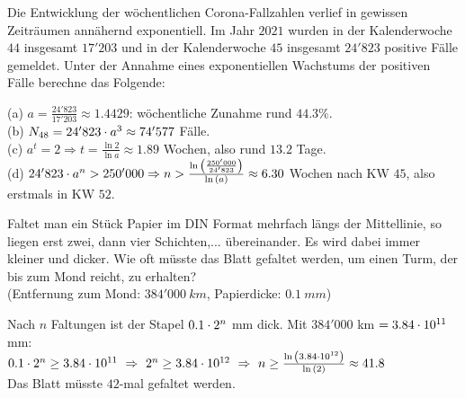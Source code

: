 \documentclass[11pt]{exam}
\begin{document}
\begin{questions}
\question[6]
Die Entwicklung der wöchentlichen Corona-Fallzahlen verlief in gewissen Zeiträumen annähernd exponentiell. Im Jahr $2021$ wurden in der Kalenderwoche $44$ insgesamt $17'203$ und in der Kalenderwoche $45$ insgesamt $24'823$ positive Fälle gemeldet. Unter der Annahme eines exponentiellen Wachstums der positiven Fälle berechne das Folgende:
{\begin{solution}
		(a) $a=\frac{24'823}{17'203}\approx1.4429$: wöchentliche Zunahme rund $44.3\%$.\\
		(b) $N_{48}=24'823\cdot a^3\approx74'577$ Fälle.\\
		(c) $a^t=2\Rightarrow t=\frac{\ln{2}}{\ln{a}}\approx1.89$ Wochen, also rund $13.2$ Tage.\\
		(d) $24'823\*a^n>250'000\Rightarrow n>\frac{\ln{\frac{250'000}{24'823}}}{\ln{a}}\approx6.30$ Wochen nach KW $45$, also erstmals in KW $52$.
\end{solution}}
{}

\question[4] %
Faltet man ein Stück Papier im DIN Format mehrfach längs der Mittellinie, so liegen erst zwei, dann vier Schichten,... übereinander. Es wird dabei immer kleiner und dicker. Wie oft müsste das Blatt gefaltet werden, um einen Turm, der bis zum Mond reicht, zu erhalten?\\
(Entfernung zum Mond: $384'000\:km$, Papierdicke: $0.1\:mm$)
{\begin{solution}
		Nach $n$ Faltungen ist der Stapel $0.1\cdot2^n$ mm dick. Mit $384'000$ km $=3.84\cdot10^{11}$ mm:\\
		$0.1\*2^n\geq3.84\*10^{11}\ \Rightarrow\ 2^n\geq3.84\*10^{12}\ \Rightarrow\ n\geq\frac{\ln{3.84\*10^{12}}}{\ln{2}}\approx41.8$\\
		Das Blatt müsste $42$-mal gefaltet werden.
\end{solution}}
{}


\end{questions}
\end{document}
